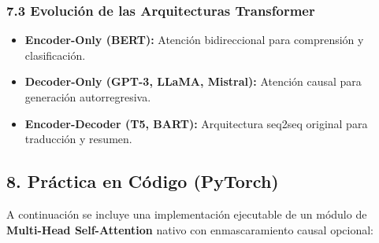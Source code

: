 \subsubsection{7.3 Evolución de las Arquitecturas Transformer}

\begin{itemize}
	\item \textbf{Encoder-Only (BERT):} Atención bidireccional para comprensión y clasificación.
	\item \textbf{Decoder-Only (GPT-3, LLaMA, Mistral):} Atención causal para generación autorregresiva.
	\item \textbf{Encoder-Decoder (T5, BART):} Arquitectura seq2seq original para traducción y resumen.
\end{itemize}

\subsection{8. Práctica en Código (PyTorch)}

A continuación se incluye una implementación ejecutable de un módulo de \textbf{Multi-Head Self-Attention} nativo con enmascaramiento causal opcional:

